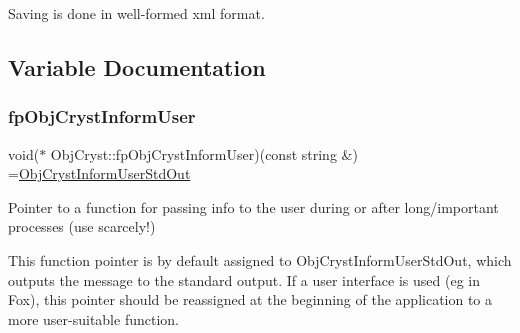 Saving is done in well-\/formed xml format. 

\subsection{Variable Documentation}
\mbox{\label{namespace_obj_cryst_a3af5335bb0e1f8decd5f33c59fe4f1e2}} 
\subsubsection{\texorpdfstring{fpObjCrystInformUser}{fpObjCrystInformUser}}
{\footnotesize\ttfamily void($\ast$ Obj\+Cryst\+::fp\+Obj\+Cryst\+Inform\+User)(const string \&) =\mbox{\hyperlink{namespace_obj_cryst_a9aa5136f02bf658a273ece563304fc03}{Obj\+Cryst\+Inform\+User\+Std\+Out}}}



Pointer to a function for passing info to the user during or after long/important processes (use scarcely!) 

This function pointer is by default assigned to Obj\+Cryst\+Inform\+User\+Std\+Out, which outputs the message to the standard output. If a user interface is used (eg in Fox), this pointer should be reassigned at the beginning of the application to a more user-\/suitable function. 